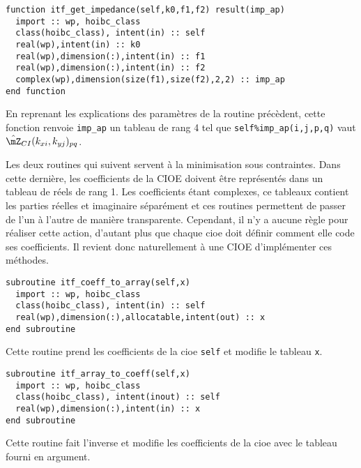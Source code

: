 \begin{lstlisting}
function itf_get_impedance(self,k0,f1,f2) result(imp_ap)
  import :: wp, hoibc_class
  class(hoibc_class), intent(in) :: self
  real(wp),intent(in) :: k0
  real(wp),dimension(:),intent(in) :: f1
  real(wp),dimension(:),intent(in) :: f2
  complex(wp),dimension(size(f1),size(f2),2,2) :: imp_ap
end function
\end{lstlisting}
      En reprenant les explications des paramètres de la routine précèdent, cette fonction renvoie \lstinline{imp_ap} un tableau de rang 4 tel que \lstinline{self%imp_ap(i,j,p,q)} vaut \(\hat\mZ_{CI}(k_{xi},k_{yj})_{pq}\). 

      Les deux routines qui suivent servent à la minimisation sous contraintes. 
      Dans cette dernière, les coefficients de la CIOE doivent être représentés dans un tableau de réels de rang 1. 
      Les coefficients étant complexes, ce tableaux contient les parties réelles et imaginaire séparément et ces routines permettent de passer de l'un à l'autre de manière transparente. 
      Cependant, il n'y a aucune règle pour réaliser cette action, d'autant plus que chaque cioe doit définir comment elle code ses coefficients. 
      Il revient donc naturellement à une CIOE d'implémenter ces méthodes.
\begin{lstlisting}
subroutine itf_coeff_to_array(self,x)
  import :: wp, hoibc_class
  class(hoibc_class), intent(in) :: self
  real(wp),dimension(:),allocatable,intent(out) :: x
end subroutine
\end{lstlisting}
      Cette routine prend les coefficients de la cioe \lstinline{self} et modifie le tableau \lstinline{x}. 

\begin{lstlisting}
subroutine itf_array_to_coeff(self,x)
  import :: wp, hoibc_class
  class(hoibc_class), intent(inout) :: self
  real(wp),dimension(:),intent(in) :: x
end subroutine
\end{lstlisting}
      Cette routine fait l'inverse et modifie les coefficients de la cioe avec le tableau fourni en argument.

